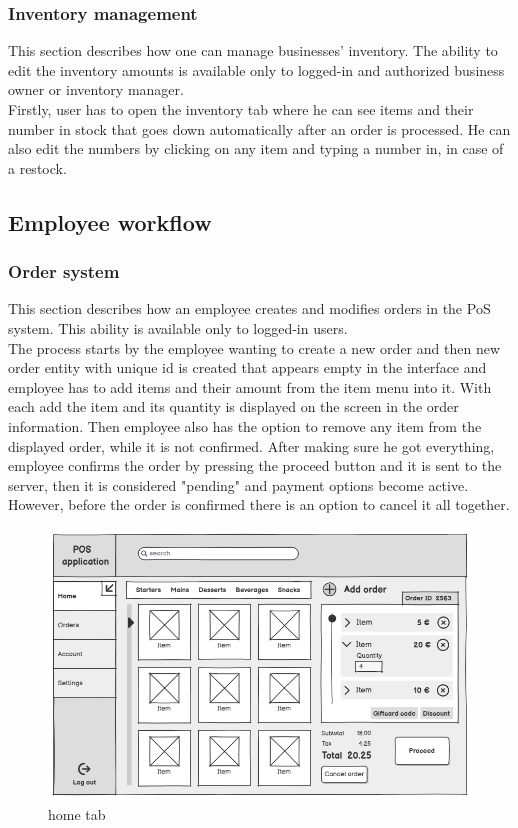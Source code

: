 \documentclass{article}
\begin{document}
    \subsubsection{Inventory management} %
    This section describes how one can manage businesses' inventory. The ability to edit the inventory amounts is available only to logged-in and authorized business owner or inventory manager.\\
    Firstly, user has to open the inventory tab where he can see items and their number in stock that goes down automatically after an order is processed. He can also edit the numbers by clicking on any item and typing a number in, in case of a restock.

    \subsection{Employee workflow}
    \subsubsection{Order system}
    This section describes how an employee creates and modifies orders in the PoS system. This ability is available only to logged-in users.\\
    The process starts by the employee wanting to create a new order and then new order entity with unique id is created that appears empty in the interface and employee has to add items and their amount from the item menu into it. With each add the item and its quantity is displayed on the screen in the order information. Then employee also has the option to remove any item from the displayed order, while it is not confirmed. After making sure he got everything, employee confirms the order by pressing the proceed button and it is sent to the server, then it is considered "pending" and payment options become active. However, before the order is confirmed there is an option to cancel it all together.
     \begin{figure}[H]
        \centering
        \includegraphics[width=0.9\linewidth]{PSP/lab-1/mockups/hometab.png}
        \caption{home tab}
        \label{}
    \end{figure}
    
\end{document}
